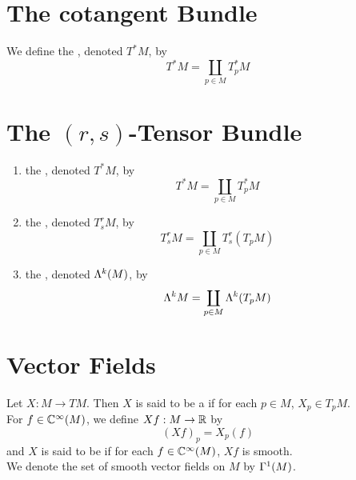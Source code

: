 \documentclass{book}
\begin{document}
	\newpage
	\section{The cotangent Bundle}
	
	\begin{defn}
		We define the , denoted $T^*M$, by 
		$$T^*M = \coprod_{p \in M} T_p^*M$$ 
	\end{defn}













	
	
	
	
	
	
	
	
	
	
	\section{The $(r,s)$-Tensor Bundle}
	
	\begin{defn}
	\begin{enumerate}
		\item the , denoted $T^*M$, by 
		$$T^*M = \coprod_{p \in M} T_p^*M$$
		\item the , denoted $T^r_sM$, by
	$$T^r_s M = \coprod_{p \in M} T^r_s(T_p M)$$
	\item the , denoted $\Lambda^k(M)$, by
	$$\Lambda^kM = \coprod_{p \in M} \Lambda^k(T_pM)$$
		\end{enumerate}
	\end{defn}
	
	
	
	
	
	
	
	
	
	
	
	
	
	
	\newpage	
	\section{Vector Fields}
	
	\begin{defn}
		Let $X: M \rightarrow TM$. Then $X$ is said to be a  if for each $p \in M$, $X_p \in T_p M$. \\
		For $f \in \mathbb{C}^{\infty}(M)$, we define $Xf : M \rightarrow \mathbb{R}$ by $$(Xf)_p = X_p(f)$$ 
		and $X$ is said to be  if for each $f \in \mathbb{C}^{\infty}(M)$, $Xf$ is smooth.\\
		We denote the set of smooth vector fields on $M$ by $\Gamma^1(M)$.
	\end{defn}
\end{document}
